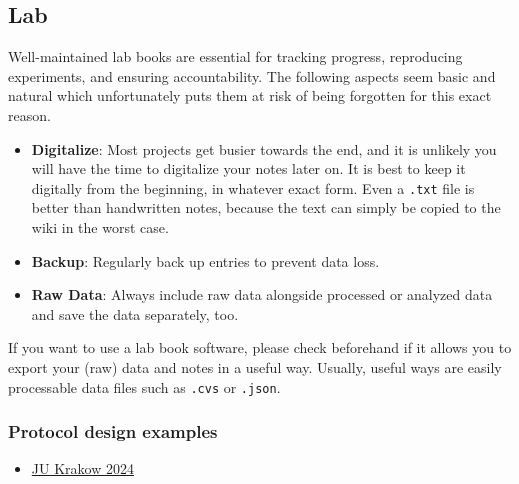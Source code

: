 \subsection{Lab} \label{subsec:lab} 
Well-maintained lab books are essential for tracking progress, reproducing experiments, and ensuring accountability.
The following aspects seem basic and natural which unfortunately puts them at risk of being forgotten for this exact reason.  
\begin{itemize}
    \item \textbf{Digitalize}: Most projects get busier towards the end, and it is unlikely you will have the time to digitalize your notes later on.
    It is best to keep it digitally from the beginning, in whatever exact form.
    Even a \texttt{.txt} file is better than handwritten notes, because the text can simply be copied to the wiki in
    the worst case.
    \item \textbf{Backup}: Regularly back up entries to prevent data loss.
    \item \textbf{Raw Data}: Always include raw data alongside processed or analyzed data and save the data separately, too.
\end{itemize}

\noindent If you want to use a lab book software, please check beforehand if it allows you to export your (raw) data and notes in a useful way.  Usually, useful ways are easily processable data files such as \texttt{.cvs} or \texttt{.json}.  \\ \newline

\subsubsection*{Protocol design examples}
\begin{itemize}
    \item \href{https://static.igem.wiki/teams/5087/pics/protocols/rna-purification.pdf}{JU Krakow 2024}
\end{itemize}

